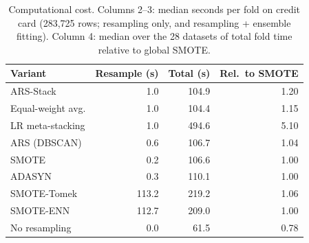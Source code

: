 \begin{table}[t]\centering\small
\caption{Computational cost. Columns 2--3: median seconds per fold on credit card (283{,}725 rows; resampling only, and resampling + ensemble fitting). Column 4: median over the 28 datasets of total fold time relative to global SMOTE.}
\label{tab:cost}
\begin{tabular}{lrrr}
\toprule
Variant & Resample (s) & Total (s) & Rel.\ to SMOTE \\
\midrule
ARS-Stack & 1.0 & 104.9 & 1.20 \\
Equal-weight avg. & 1.0 & 104.4 & 1.15 \\
LR meta-stacking & 1.0 & 494.6 & 5.10 \\
ARS (DBSCAN) & 0.6 & 106.7 & 1.04 \\
SMOTE & 0.2 & 106.6 & 1.00 \\
ADASYN & 0.3 & 110.1 & 1.00 \\
SMOTE-Tomek & 113.2 & 219.2 & 1.06 \\
SMOTE-ENN & 112.7 & 209.0 & 1.00 \\
No resampling & 0.0 & 61.5 & 0.78 \\
\bottomrule
\end{tabular}
\end{table}